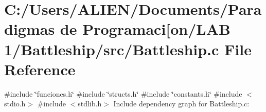 \section{C\+:/\+Users/\+A\+L\+I\+E\+N/\+Documents/\+Paradigmas de Programaci[on/\+L\+AB 1/\+Battleship/src/\+Battleship.c File Reference}
\label{_battleship_8c}\index{C\+:/\+Users/\+A\+L\+I\+E\+N/\+Documents/\+Paradigmas de Programaci[on/\+L\+A\+B 1/\+Battleship/src/\+Battleship.\+c@{C\+:/\+Users/\+A\+L\+I\+E\+N/\+Documents/\+Paradigmas de Programaci[on/\+L\+A\+B 1/\+Battleship/src/\+Battleship.\+c}}
{\ttfamily \#include \char`\"{}funciones.\+h\char`\"{}}\newline
{\ttfamily \#include \char`\"{}structs.\+h\char`\"{}}\newline
{\ttfamily \#include \char`\"{}constants.\+h\char`\"{}}\newline
{\ttfamily \#include $<$stdio.\+h$>$}\newline
{\ttfamily \#include $<$stdlib.\+h$>$}\newline
Include dependency graph for Battleship.\+c\+:
